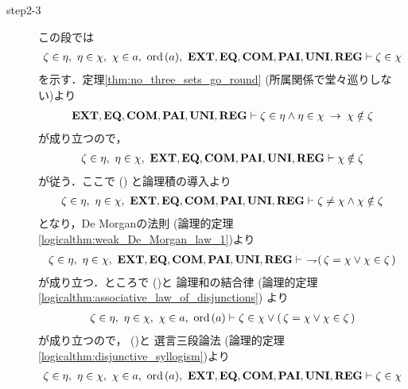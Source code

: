 \begin{sketch}
\begin{description}
\begin{description}
					\item[step2-3] この段では
						\begin{align}
							\zeta \in \eta,\ \eta \in \chi,\ \chi \in a,\ \ord{a},\ 
							\EXTAX,\EQAX,\COMAX,\PAIAX,\UNIAX,\REGAX \vdash 
							\zeta \in \chi
						\end{align}
						を示す．定理\ref{thm:no_three_sets_go_round}
						(所属関係で堂々巡りしない)より
						\begin{align}
							\mbox{{\bf EXT}},\mbox{{\bf EQ}},\mbox{\bf COM},\mbox{{\bf PAI}},\mbox{{\bf UNI}},\mbox{{\bf REG}} \vdash 
							\zeta \in \eta \wedge \eta \in \chi \hspace{0.25em}\rightarrow\hspace{0.25em} 
							\chi \notin \zeta
						\end{align}
						が成り立つので，
						\begin{align}
							\zeta \in \eta,\ \eta \in \chi,\ 
							\EXTAX,\EQAX,\COMAX,\PAIAX,\UNIAX,\REGAX \vdash 
							\chi \notin \zeta
						\end{align}
						が従う．ここで
						()
						と論理積の導入より
						\begin{align}
							\zeta \in \eta,\ \eta \in \chi,\ 
							\EXTAX,\EQAX,\COMAX,\PAIAX,\UNIAX,\REGAX \vdash 
							\zeta \neq \chi \wedge \chi \notin \zeta
						\end{align}
						となり，De Morganの法則
						(論理的定理\ref{logicalthm:weak_De_Morgan_law_1})より
						\begin{align}
							\zeta \in \eta,\ \eta \in \chi,\ 
							\EXTAX,\EQAX,\COMAX,\PAIAX,\UNIAX,\REGAX \vdash\ 
							\negation (\, \zeta = \chi \vee \chi \in \zeta\, )
							\label{fom:thm_transitive_totally_ordered_class_7}
						\end{align}
						が成り立つ．ところで
						()と
						論理和の結合律
						(論理的定理\ref{logicalthm:associative_law_of_disjunctions})
						より
						\begin{align}
							\zeta \in \eta,\ \eta \in \chi,\ \chi \in a,\ \operatorname*{ord}\hspace{0.15em}(a) 
							\vdash 
							\zeta \in \chi \vee (\, \zeta = \chi \vee \chi \in \zeta\, )
						\end{align}
						が成り立つので，
						()と
						選言三段論法
						(論理的定理\ref{logicalthm:disjunctive_syllogism})より
						\begin{align}
							\zeta \in \eta,\ \eta \in \chi,\ \chi \in a,\ \ord{a},\ 
							\EXTAX,\EQAX,\COMAX,\PAIAX,\UNIAX,\REGAX \vdash 
							\zeta \in \chi
							\label{fom:thm_transitive_totally_ordered_class_8}
						\end{align}

\end{description}
\end{description}
\end{sketch}
